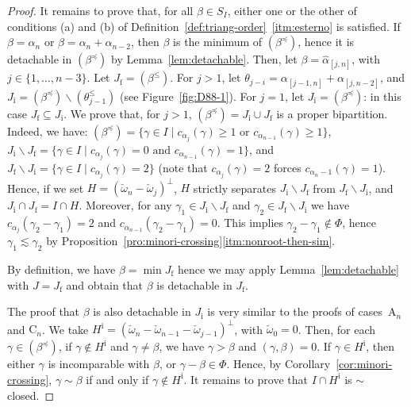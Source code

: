 \documentclass[10pt]{amsart}
\theoremstyle{definition}
\theoremstyle{remark}
\newcommand\wh{\widehat}
\newcommand\smeno{\smallsetminus}
\newcommand\al{\alpha}
\newcommand\be{\beta}
\newcommand\ga{\gamma}
\newcommand\preq{\preccurlyeq}
\renewcommand{\leq}{\leqslant}
\begin{document}
\begin{proof}
\par
It remains to prove that, for all $\be\in S_I$, either one or the other of conditions (a) and (b) of Definition~\ref{def:triang-order}~\ref{itm:esterno} is satisfied.
If $\be=\al_n$ or $\be=\al_{n}+\al_{n-2}$, then $\be$ is the minimum of $(\be^\preq)$, hence it is detachable in  $(\be^\preq)$ by  Lemma~\ref{lem:detachable}. 
Then, let $\be=\wh\al_{[j,n]}$, with $j\in\{1,\dots,n-3\}$.
Let $J_{\mathrm f}=(\be^\leq)$. 
For $j>1$, let $\theta_{j-i}=\al_{[j-1,n]}+\al_{[j,n-2]}$, and $J_{\mathrm i}=(\be^\preq)\smeno (\theta_{j-1}^\leq) $ (see Figure~\ref{fig:D88-1}). 
For $j=1$, let  $J_{\mathrm i}=(\be^\preq)$: in this case $J_{\mathrm f}\subseteq J_{\mathrm i}$.
We prove that, for $j>1$,  $(\be^\preq)=J_{\mathrm i}\cup J_{\mathrm f}$ is a proper bipartition.
Indeed, we have: $(\be^\preq)=\{\ga\in I\mid c_{\al_j}(\ga)\geq 1 \text { or }  c_{\al_{n-1}}(\ga)\geq 1\}$, $J_{\mathrm i}\smeno J_{\mathrm f}=\{\ga\in I\mid c_{\al_j}(\ga)=0 \text{ and } c_{\al_{n-1}}(\ga)=1\}$, and $J_{\mathrm f}\smeno J_{\mathrm i}=\{\ga\in I\mid c_{\al_j}(\ga)=2\}$ (note that $c_{\al_j}(\ga)=2$ forces $c_{\al_n-1}(\ga)=1$). 
Hence, if we set $H=(\check\omega_n-\check\omega_j)^\perp$, $H$ strictly separates $J_{\mathrm i}\smeno J_{\mathrm f}$ from $J_{\mathrm f}\smeno J_{\mathrm i}$, and $J_{\mathrm i}\cap J_{\mathrm f}=I\cap H$. 
Moreover, for any $\ga_1\in J_{\mathrm i}\smeno J_{\mathrm f}$ and $\ga_2\in J_{\mathrm f}\smeno J_{\mathrm i}$ we have $c_{\al_j}(\ga_2-\ga_1)=2$ and $c_{\al_{n-1}}(\ga_2-\ga_1)=0$. 
This implies $\ga_2-\ga_1\not\in \Phi$, hence  $\ga_1\lesssim \ga_2$ by Proposition~\ref{pro:minori-crossing}\ref{itm:nonroot-then-sim}.
\par 
By  definition, we have $\be=\min J_\mathrm f$ hence we may apply Lemma~\ref{lem:detachable} with $J=J_{\mathrm f}$ and obtain that $\be$ is detachable in $J_\mathrm f$.
\enlargethispage{10cm}%
\par
The proof that $\be$ is also detachable in  $J_{\mathrm i}$ is very similar to the proofs of cases~$\mathrm A_{n}$ and $\mathrm C_n$.
We take  $H^{\mathrm i} =(\check\omega_n-\check\omega_{n-1}-\check\omega_{j-1})^\perp$, with $\check\omega_{0}=0$. 
Then, for each $\ga\in(\be^\preq)$, if $\ga\notin H^{\mathrm i}$ and $\ga\neq \be$, we have $\ga> \be$ and $(\ga, \be)=0$. 
If $\ga\in H^{\mathrm i}$, then either $\ga$ is incomparable with $\be$, or $\ga-\be\in \Phi$. 
Hence, by Corollary~\ref{cor:minori-crossing}, $\ga\sim\be$ if and only if $\ga\not\in H^{\mathrm i}$. 
It remains to prove that $I\cap H^{\mathrm i}$ is $\sim$closed.

\end{proof}
\end{document}
